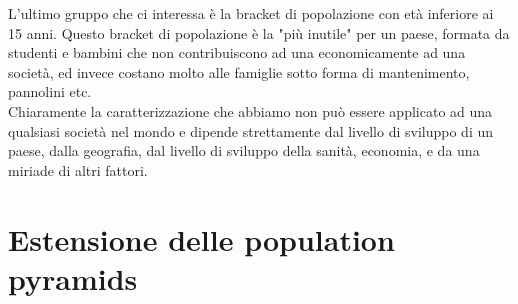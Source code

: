 \documentclass[11pt, oneside]{article}   	%
\begin{document}
L'ultimo gruppo che ci interessa è la bracket di popolazione con età inferiore ai 15 anni. Questo bracket di popolazione è la "più inutile" per un paese, formata da studenti e bambini che non contribuiscono ad una economicamente ad una società, ed invece costano molto alle famiglie sotto forma di mantenimento, pannolini etc.\\

Chiaramente la caratterizzazione che abbiamo non può essere applicato ad una qualsiasi società nel mondo e dipende strettamente dal livello di sviluppo di un paese, dalla geografia, dal livello di sviluppo della sanità, economia, e da una miriade di altri fattori. 

\section{Estensione delle population pyramids}
\end{document}
